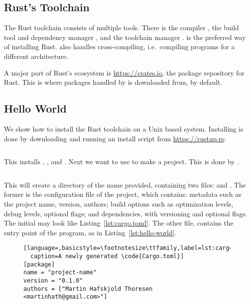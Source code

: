 \documentclass[b5paper]{report}
\begin{document}
\begin{appendices}
  \chapter{Rust's Toolchain}
  The Rust toolchain consists of multiple tools. There is the compiler
  \rustc{}, the build tool and dependency manager \cargo{}, and the toolchain
  manager \rustup.  \rustup{} is the preferred way of installing
  Rust.  \rustup{} also handles cross-compiling, i.e.\
  compiling programs for a different architecture.

  A major part of Rust's ecosystem is \url{https://crates.io}, the package repository
  for Rust. This is where packages handled by \cargo{} is downloaded from, by default.

  \section{Hello World}
  We show how to install the Rust toolchain on a Unix based system.
  Installing \rustup{} is done by downloading and running an install script from
  \url{https://rustup.rs}:
  \begin{lstlisting}[language=Bash,numbers=none]
% curl https://sh.rustup.rs -sSf | sh
  \end{lstlisting}
  This installs \rustup{}, \cargo{}, and \rustc{}.
  Next we want to use \cargo{} to make a project. This is done by .
  \begin{lstlisting}[language=Bash,numbers=none]
% cargo init --bin <name-of-project>
  \end{lstlisting}
  This will create a directory of the name provided, containing two files:
  \code{Cargo.toml} and \code{src/main.rs}.
  The former is the configuration file of the project, which contains:
  metadata such as the project name, version, authors;
  build options such as optimization levels, debug levels, optional flags;
  and dependencies, with versioning and optional flags.
  The initial  may look like Listing~\ref{lst:cargo.toml}.
  The other file, \code{src/main.rs} contains the entry point of the program, as
  in Listing~\ref{lst:hello-world}.

  \begin{figure}[p]
  \begin{lstlisting}[language=,basicstyle=\footnotesize\ttfamily,label=lst:cargo.toml,
  caption=A newly generated \code{Cargo.toml}]
[package]
name = "project-name"
version = "0.1.0"
authors = ["Martin Hafskjold Thoresen <martinhath@gmail.com>"]


\end{lstlisting}
\end{figure}
\end{appendices}
\end{document}
